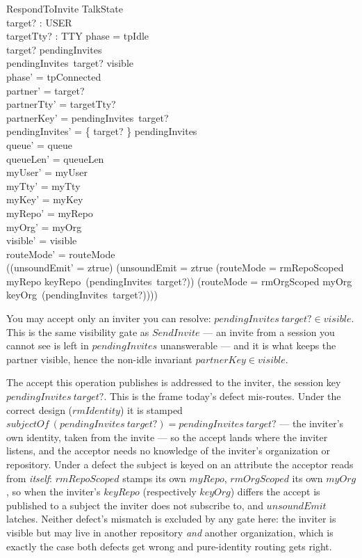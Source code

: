 \documentclass[a4paper,10pt,fleqn]{article}
\begin{document}
\begin{schema}{RespondToInvite}
  \Delta TalkState \\
  target? : USER \\
  targetTty? : TTY
\where
  phase = tpIdle \\
  target? \in \dom pendingInvites \\
  pendingInvites~target? \in visible \\
  phase' = tpConnected \\
  partner' = target? \\
  partnerTty' = targetTty? \\
  partnerKey' = pendingInvites~target? \\
  pendingInvites' = \{ target? \} \ndres pendingInvites \\
  queue' = queue \\
  queueLen' = queueLen \\
  myUser' = myUser \\
  myTty' = myTty \\
  myKey' = myKey \\
  myRepo' = myRepo \\
  myOrg' = myOrg \\
  visible' = visible \\
  routeMode' = routeMode \\
  ((unsoundEmit' = ztrue) \iff
    (unsoundEmit = ztrue \lor
      (routeMode = rmRepoScoped \land
        myRepo \neq keyRepo~(pendingInvites~target?)) \lor
      (routeMode = rmOrgScoped \land
        myOrg \neq keyOrg~(pendingInvites~target?))))
\end{schema}

You may accept only an inviter you can resolve: $pendingInvites~target?
\in visible$.  This is the same visibility gate as $SendInvite$ --- an
invite from a session you cannot see is left in $pendingInvites$
unanswerable --- and it is what keeps the partner visible, hence the
non-idle invariant $partnerKey \in visible$.

The accept this operation publishes is addressed to the inviter, the
session key $pendingInvites~target?$.  This is the frame today's defect
mis-routes.  Under the correct design ($rmIdentity$) it is stamped
$subjectOf~(pendingInvites~target?) = pendingInvites~target?$ --- the
inviter's own identity, taken from the invite --- so the accept lands
where the inviter listens, and the acceptor needs no knowledge of the
inviter's organization or repository.  Under a defect the subject is
keyed on an attribute the acceptor reads from \emph{itself}: $rmRepoScoped$
stamps its own $myRepo$, $rmOrgScoped$ its own $myOrg$, so when the
inviter's $keyRepo$ (respectively $keyOrg$) differs the accept is
published to a subject the inviter does not subscribe to, and
$unsoundEmit$ latches.  Neither defect's mismatch is excluded by any
gate here: the inviter is visible but may live in another repository
\emph{and} another organization, which is exactly the case both defects
get wrong and pure-identity routing gets right.
\end{document}
